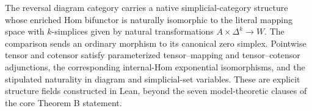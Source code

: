 \begin{resultblock}
\begin{proposition}
\label{catalogue:B10}
The reversal diagram category carries a native simplicial-category structure whose enriched Hom bifunctor is naturally isomorphic to the literal mapping space with $k$-simplices given by natural transformations $A\times\Delta^k\to W$.
The comparison sends an ordinary morphism to its canonical zero simplex.
Pointwise tensor and cotensor satisfy parameterized tensor--mapping and tensor--cotensor adjunctions, the corresponding internal-Hom exponential isomorphisms, and the stipulated naturality in diagram and simplicial-set variables.
These are explicit structure fields constructed in Lean, beyond the seven model-theoretic clauses of the core Theorem B statement.
\end{proposition}

\end{resultblock}

